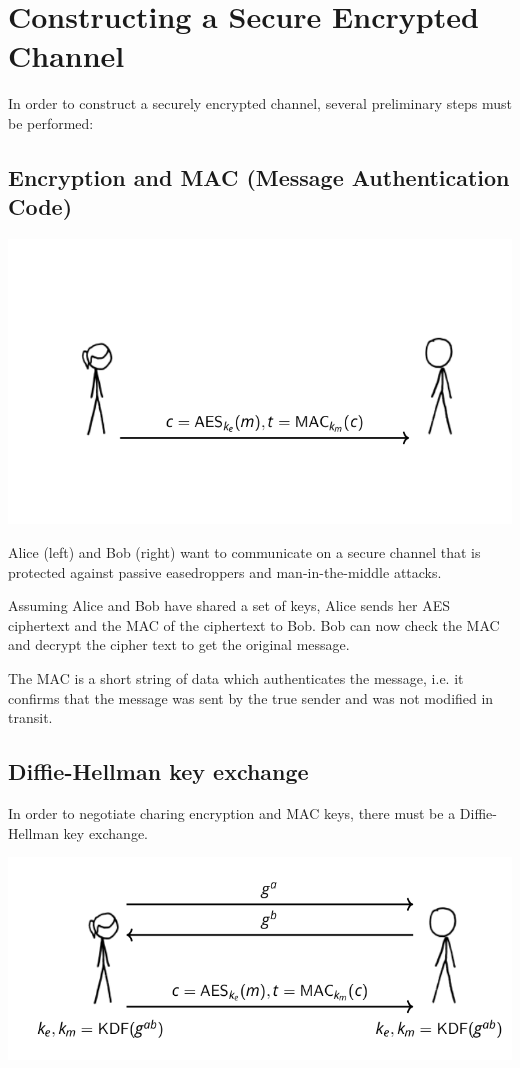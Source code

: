 \documentclass[11pt]{article} %
\begin{document}
\section{Constructing a Secure Encrypted Channel}
In order to construct a securely encrypted channel, several preliminary
steps must be performed:

\subsection{Encryption and MAC (Message Authentication Code)}

\begin{center}
	\includegraphics[scale=.7]{./tls1.png}
\end{center}

{\parindent0pt Alice (left) and Bob (right) want to communicate on a secure 
channel that is protected against passive easedroppers and man-in-the-middle
attacks.}

\bigskip
{\parindent0pt Assuming Alice and Bob have shared a set of keys, Alice sends her
AES ciphertext and the MAC of the ciphertext to Bob.  Bob can now check the MAC
and decrypt the cipher text to get the original message.}

\bigskip
{\parindent0pt The MAC is a short string of data which authenticates the message, i.e. it
confirms that the message was sent by the true sender and was not modified in transit.}

\subsection{Diffie-Hellman key exchange}
In order to negotiate charing encryption and MAC keys, there must be a
Diffie-Hellman key exchange.

\begin{center}
	\includegraphics[scale=.7]{./tls2.png}
\end{center}
\end{document}
